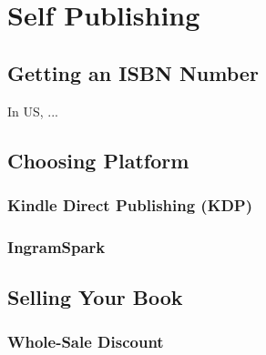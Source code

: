 
\chapter{Self Publishing}
\label{chapter:publishing}

\thispagestyle{empty}

\lipsum[2]


\minitoc
\newpage



\section{Getting an ISBN Number}

In US, ...




\section{Choosing Platform}


\subsection{Kindle Direct Publishing (KDP)}




\subsection{IngramSpark} 






\section{Selling Your Book}



\subsection{Whole-Sale Discount} 





